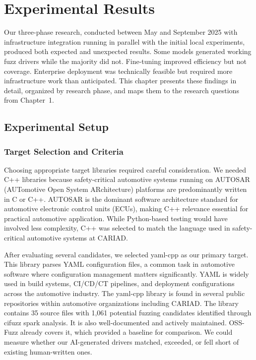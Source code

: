 
\chapter{Experimental Results}
\label{chap:results}

Our three-phase research, conducted between May and September 2025 with infrastructure integration running in parallel with the initial local experiments, produced both expected and unexpected results. Some models generated working fuzz drivers while the majority did not. Fine-tuning improved efficiency but not coverage. Enterprise deployment was technically feasible but required more infrastructure work than anticipated. This chapter presents these findings in detail, organized by research phase, and maps them to the research questions from Chapter~1.


\section{Experimental Setup}
\label{sec:exp_setup}

\subsection{Target Selection and Criteria}
\label{sec:exp_targets}

Choosing appropriate target libraries required careful consideration. We needed C++ libraries because safety-critical automotive systems running on AUTOSAR (AUTomotive Open System ARchitecture) \cite{autosar} platforms are predominantly written in C or C++. AUTOSAR is the dominant software architecture standard for automotive electronic control units (ECUs), making C++ relevance essential for practical automotive application. While Python-based testing would have involved less complexity, C++ was selected to match the language used in safety-critical automotive systems at CARIAD.

After evaluating several candidates, we selected yaml-cpp as our primary target. This library parses YAML configuration files, a common task in automotive software where configuration management matters significantly. YAML is widely used in build systems, CI/CD/CT pipelines, and deployment configurations across the automotive industry. The yaml-cpp library is found in several public repositories within automotive organizations including CARIAD. The library contains 35 source files with 1,061 potential fuzzing candidates identified through cifuzz spark analysis. It is also well-documented and actively maintained. OSS-Fuzz \cite{OSSFuzzBugs2021} already covers it, which provided a baseline for comparison. We could measure whether our AI-generated drivers matched, exceeded, or fell short of existing human-written ones.

